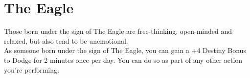 \section{The Eagle}\label{zodiac:eagle}

Those born under the sign of The Eagle are free-thinking, open-minded and relaxed, but also tend to be unemotional.\\
As someone born under the sign of The Eagle, you can gain a +4 Destiny Bonus to Dodge for 2 minutes once per day.
You can do so as part of any other action you're performing.\\
